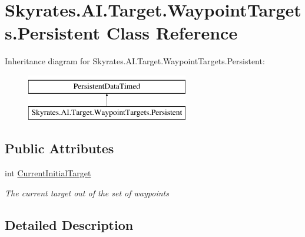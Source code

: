 \hypertarget{class_skyrates_1_1_a_i_1_1_target_1_1_waypoint_targets_1_1_persistent}{\section{Skyrates.\-A\-I.\-Target.\-Waypoint\-Targets.\-Persistent Class Reference}
\label{class_skyrates_1_1_a_i_1_1_target_1_1_waypoint_targets_1_1_persistent}
}


 


Inheritance diagram for Skyrates.\-A\-I.\-Target.\-Waypoint\-Targets.\-Persistent\-:\begin{figure}[H]
\begin{center}
\leavevmode
\includegraphics[height=2.000000cm]{class_skyrates_1_1_a_i_1_1_target_1_1_waypoint_targets_1_1_persistent}
\end{center}
\end{figure}
\subsection*{Public Attributes}
\begin{DoxyCompactItemize}
\item 
int \hyperlink{class_skyrates_1_1_a_i_1_1_target_1_1_waypoint_targets_1_1_persistent_ac5d258057158129627cf1196a04b7eb1}{Current\-Initial\-Target}
\begin{DoxyCompactList}\small\item\em The current target out of the set of waypoints \end{DoxyCompactList}\end{DoxyCompactItemize}


\subsection{Detailed Description}


